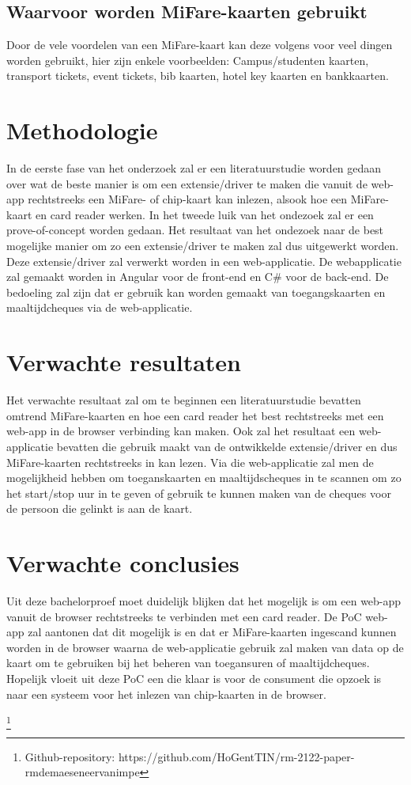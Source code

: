 \documentclass{hogent-article}
\begin{document}
\subsection{Waarvoor worden MiFare-kaarten gebruikt}
Door de vele voordelen van een MiFare-kaart kan deze volgens \textcite{Digitalid} voor veel dingen worden gebruikt, hier zijn enkele voorbeelden: Campus/studenten kaarten, transport tickets, event tickets, bib kaarten, hotel key kaarten en bankkaarten.

\section{Methodologie}
In de eerste fase van het onderzoek zal er een literatuurstudie worden gedaan over wat de beste manier is om een extensie/driver te maken die vanuit de web-app rechtstreeks een MiFare- of chip-kaart kan inlezen, alsook hoe een MiFare-kaart en card reader werken. In het tweede luik van het ondezoek zal er een prove-of-concept worden gedaan. Het resultaat van het ondezoek naar de best mogelijke manier om zo een extensie/driver te maken zal dus uitgewerkt worden. Deze extensie/driver zal verwerkt worden in een web-applicatie. De webapplicatie zal gemaakt worden in Angular voor de front-end en C\# voor de back-end. De bedoeling zal zijn dat er gebruik kan worden gemaakt van toegangskaarten en maaltijdcheques via de web-applicatie.

\section{Verwachte resultaten}
Het verwachte resultaat zal om te beginnen een literatuurstudie bevatten omtrend MiFare-kaarten en hoe een card reader het best rechtstreeks met een web-app in de browser verbinding kan maken.
Ook zal het resultaat een web-applicatie bevatten die gebruik maakt van de ontwikkelde extensie/driver en dus MiFare-kaarten rechtstreeks in kan lezen. Via die web-applicatie zal men de mogelijkheid hebben om toeganskaarten en maaltijdscheques in te scannen om zo het start/stop uur in te geven of gebruik te kunnen maken van de cheques voor de persoon die gelinkt is aan de kaart.

\section{Verwachte conclusies}
Uit deze bachelorproef moet duidelijk blijken dat het mogelijk is om een web-app vanuit de browser rechtstreeks te verbinden met een card reader. De PoC web-app zal aantonen dat dit mogelijk is en dat er MiFare-kaarten ingescand kunnen worden in de browser waarna de web-applicatie gebruik zal maken van data op de kaart om te gebruiken bij het beheren van toegansuren of maaltijdcheques. Hopelijk vloeit uit deze PoC een die klaar is voor de consument die opzoek is naar een systeem voor het inlezen van chip-kaarten in de browser.

\printbibliography[heading=bibintoc]
\footnote{Github-repository: https://github.com/HoGentTIN/rm-2122-paper-rmdemaeseneervanimpe}
\end{document}
